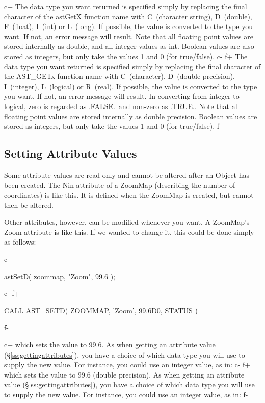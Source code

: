 \documentclass[twoside,11pt]{starlink}
\providecommand{\secref}[1]{\S\ref{#1}}
\begin{document}
c+
The data type you want returned is specified simply by replacing the
final character of the astGetX function name with C~(character
string), D~(double), F~(float), I~(int) or L~(long). If possible, the
value is converted to the type you want. If not, an error message will
result. Note that all floating point values are stored internally as
double, and all integer values as int. Boolean values are also stored
as integers, but only take the values 1 and 0 (for true/false).
c-
f+
The data type you want returned is specified simply by replacing the
final character of the AST\_GETx function name with C~(character),
D~(double precision), I~(integer), L~(logical) or R~(real). If
possible, the value is converted to the type you want. If not, an
error message will result. In converting from integer to logical, zero
is regarded as .FALSE.\ and non-zero as .TRUE.. Note that all floating
point values are stored internally as double precision. Boolean values
are stored as integers, but only take the values 1 and 0 (for
true/false).
f-

\subsection{\label{ss:settingattributes}Setting Attribute Values}

Some attribute values are read-only and cannot be altered after an
Object has been created. The Nin attribute of a ZoomMap (describing
the number of coordinates) is like this. It is defined when the
ZoomMap is created, but cannot then be altered.

Other attributes, however, can be modified whenever you want. A
ZoomMap's Zoom attribute is like this. If we wanted to change it, this
could be done simply as follows:

c+
\small
\begin{terminalv}
astSetD( zoommap, "Zoom", 99.6 );
\end{terminalv}
\normalsize
c-
f+
\small
\begin{terminalv}
      CALL AST_SETD( ZOOMMAP, 'Zoom', 99.6D0, STATUS )
\end{terminalv}
\normalsize
f-

c+
which sets the value to 99.6. As when getting an attribute value
(\secref{ss:gettingattributes}), you have a choice of which data type
you will use to supply the new value. For instance, you could use an
integer value, as in:
c-
f+
which sets the value to 99.6 (double precision). As when getting an
attribute value (\secref{ss:gettingattributes}), you have a choice of
which data type you will use to supply the new value. For instance,
you could use an integer value, as in:
f-
\end{document}

